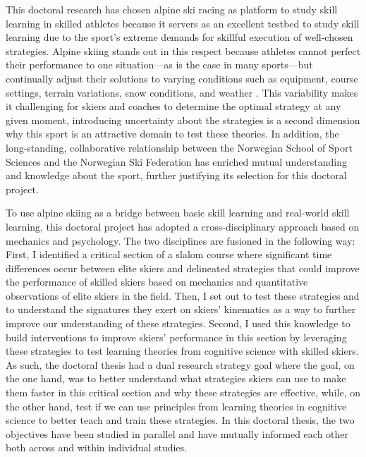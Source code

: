 This doctoral research has chosen alpine ski racing as platform to study skill learning in skilled athletes because it servers as an excellent testbed to study skill learning due to the sport's extreme demands for skillful execution of well-chosen strategies. Alpine skiing stands out in this respect because athletes cannot perfect their performance to one situation—as is the case in many sports—but continually adjust their solutions to varying conditions such as equipment, course settings, terrain variations, snow conditions, and weather \parencite{gilgien_training_2018, supej_recent_2019, reid_kinematic_2010}. This variability makes it challenging for skiers and coaches to determine the optimal strategy at any given moment, introducing uncertainty about the strategies is a second dimension why this sport is an attractive domain to test these theories. In addition, the long-standing, collaborative relationship between the Norwegian School of Sport Sciences and the Norwegian Ski Federation has enriched mutual understanding and knowledge about the sport, further justifying its selection for this doctoral project. 

To use alpine skiing as a bridge between basic skill learning and real-world skill learning, this doctoral project has adopted a cross-disciplinary approach based on mechanics and psychology. The two disciplines are fusioned in the following way: First, I identified a critical section of a slalom course where significant time differences occur between elite skiers and delineated strategies that could improve the performance of skilled skiers based on mechanics and quantitative observations of elite skiers in the field. Then, I set out to test these strategies and to understand the signatures they exert on skiers' kinematics as a way to further improve our understanding of these strategies. Second, I used this knowledge to build interventions to improve skiers' performance in this section by leveraging these strategies to test learning theories from cognitive science with skilled skiers. As such, the doctoral thesis had a dual research strategy goal where the goal, on the one hand, was to better understand what strategies skiers can use to make them faster in this critical section and why these strategies are effective, while, on the other hand, test if we can use principles from learning theories in cognitive science to better teach and train these strategies. In this doctoral thesis, the two objectives have been studied in parallel and have mutually informed each other both across and within individual studies. 

